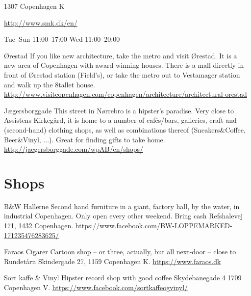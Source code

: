 \begin{left}
\begin{funitem}
{\begin{addr}
{1307 Copenhagen K}
\end{addr}}
{\url{http://www.smk.dk/en/}}
{\begin{ohours}
{Tue–Sun}
{11:00–17:00}
{Wed}
{11:00–20:00}
{}
{}
{}
{}
\end{ohours}}
\end{funitem}
\begin{funitemshort}
{Ørestad}
{If you like new architecture, take the metro and visit Ørestad. It is a new area of Copenhagen with award-winning houses. There is a mall directly in front of Ørestad station (Field’s), or take the metro out to Vestamager station and walk up the 8tallet house.}
{\url{http://www.visitcopenhagen.com/copenhagen/architecture/architectural-orestad}}
\end{funitemshort}
\begin{funitemshort}
{Jægersborggade}
{This street in Nørrebro is a hipster’s paradise. Very close to Assistens Kirkegård, it is home to a number of cafés/bars, galleries, craft and (second-hand) clothing shops, as well as combinations thereof (Sneakers&Coffee, Beer&Vinyl, ...). Great for finding gifts to take home. }
{\url{http://jaegersborggade.com/wpAB/en/shops/}}
\end{funitemshort}

\section{Shops}

\begin{shopitem}
{B\&W Hallerne}%
{Second hand furniture in a giant, factory hall, by the water, in industrial Copenhagen. Only open every other weekend. Bring cash}%
{Refshalevej 171, 1432 Copenhagen.}%
{\url{https://www.facebook.com/BW-LOPPEMARKED-171235476283625/}}%
\end{shopitem}

\begin{shopitem}
{Faraos Cigarer}%
{Cartoon shop – or three, actually, but all next-door – close to Rundetårn}%
{Skindergade 27, 1159 Copenhagen K.}%
{\url{https://www.faraos.dk}}%
\end{shopitem}

\begin{shopitem}
{Sort kaffe \& Vinyl}%
{Hipster record shop with good coffee}%
{Skydebanegade 4
1709 Copenhagen V.}%
{\url{https://www.facebook.com/sortkaffeogvinyl/}}%
\end{shopitem}


\end{left}
